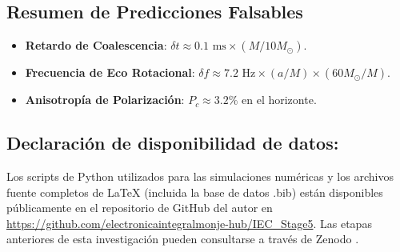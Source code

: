 \documentclass[11pt,a4paper]{article}
\begin{document}
\subsection{Resumen de Predicciones Falsables}
\begin{itemize}
	\item \textbf{Retardo de Coalescencia}: $\delta t \approx 0.1 \text{ ms} \times (M/10 M_\odot)$.
	\item \textbf{Frecuencia de Eco Rotacional}: $\delta f \approx 7.2 \text{ Hz} \times (a/M) \times (60 M_\odot / M)$.
	\item \textbf{Anisotropía de Polarización}: $P_c \approx 3.2\%$ en el horizonte.
\end{itemize}

\subsection{Declaración de disponibilidad de datos:} Los scripts de Python utilizados para las simulaciones numéricas y los archivos fuente completos de LaTeX (incluida la base de datos .bib) están disponibles públicamente en el repositorio de GitHub del autor en \url{https://github.com/electronicaintegralmonje-hub/IEC_Stage5}. Las etapas anteriores de esta investigación pueden consultarse a través de Zenodo \cite{DOI_Etapa1, DOI_Etapa2, DOI_Etapa3, Etapa4_Archive}.

\printbibliography
\end{document}
